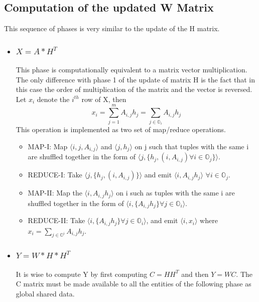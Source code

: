 \documentclass[a4paper,12pt]{article}
\begin{document}
	
	\subsection{Computation of the updated W Matrix}
    This sequence of phases is very similar to the update of the H matrix.

    \begin{itemize}
      \item \subsubsection{$ X = A * H^T $}
        This phase is computationally equivalent to a matrix vector multiplication. The only difference with phase 1 of the update of matrix H is the fact that in this case the order of multiplication of the matrix and the vector is reversed. 
        Let $x_i$ denote the $i^{th}$ row of X, then 
        $$ x_i = \sum_{j=1}^{m} A_{i,j} h_{j} = \sum_{j \in \mathbb{O}_i} A_{i,j} h_{j} $$
        This operation is implemented as two set of map/reduce
        operations.
        \begin{itemize}
          \item MAP-I: Map $ \langle i, j, A_{i,j} \rangle $ and $\langle j, h_j \rangle$ on j
            such that tuples with the same i are shuffled together in
            the form of  $ \langle j, \{h_{j}, (i, A_{i,j}) \forall i \in \mathbb{O}_j \} \rangle$.

         \item REDUCE-I: Take  $ \langle j, \{h_{j}, (i, A_{i,j}) \}
           \rangle$ and emit  $ \langle i, A_{i,j}  h_{j} \rangle$ $\forall i \in \mathbb{O}_j $.

          \item MAP-II: Map the $ \langle i, A_{i,j}  h_{j} \rangle$ on i such as tuples with the 
            same i are shuffled together in the form of $ \langle i, \{A_{i,j}  h_{j} \}
           \forall j \in \mathbb{O}_i \rangle$.

          \item REDUCE-II: Take $ \langle i, \{A_{i,j}  h_{j} \}
           \forall j \in \mathbb{O}_i \rangle$, and emit $\langle i,
           x_i \rangle$ where $ x_i = \sum_{j \in \mathbb{O}^i} A_{i,j}  h_{j} $.

         \end{itemize}

     \item \subsubsection{$ Y = W * H * H^T $}
       It is wise to compute Y by first computing $C= H H^T$ and then
       $Y=WC$. 
       The C matrix must be made available to all the entities
       of the following phase as global
       shared data.


\end{itemize}
\end{document}
